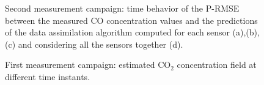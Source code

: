 \documentclass[journal]{IEEEtran}
\begin{document}
\begin{figure}[p]
{		\label{fig:nodes_tetra_3D}}
{}
	\caption{Second measurement campaign: time behavior of the P-RMSE between the measured CO concentration values and the predictions of the data assimilation algorithm computed for each sensor
(a),(b),(c) and considering all the sensors together (d).}
	\label{fig:rmse_real_mes2}
\end{figure}
\begin{figure}[h!]
\hspace*{-1cm} 
	\centering
	\centering
	\hfil
\hspace*{-1cm} 
	\caption{First measurement campaign: estimated CO$_2$ concentration field at different time instants.}
	\label{fig:co2_real_field}
\end{figure}
\end{document}
